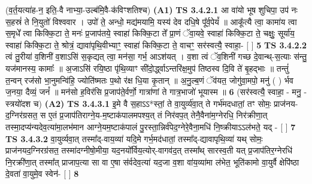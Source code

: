 \documentclass[17pt]{extarticle}
\begin{document}
                  \newline
                      (व॒र्त॒यत्या॑ह-न॒ इति॒-वै नाभ्या॒-उल्ब॑मि॒वै-क॑विꣳशतिश्च)  \textbf{(A1)} \newline \newline
                                        \textbf{ TS 3.4.2.1} \newline
                  आ वा॑यो भूष शुचिपा॒ उप॑ नः स॒हस्रं॑ ते नि॒युतो॑ विश्ववार । उपो॑ ते॒ अन्धो॒ मद्य॑मयामि॒ यस्य॑ देव दधि॒षे पू᳚र्व॒पेयं᳚ ॥ आकू᳚त्यै त्वा॒ कामा॑य त्वा स॒मृधे᳚ त्वा किक्कि॒टा ते॒ मनः॑ प्र॒जाप॑तये॒ स्वाहा॑ किक्कि॒टा ते᳚ प्रा॒णं ॅवा॒यवे॒ स्वाहा॑ किक्कि॒टा ते॒ चक्षुः॒ सूर्या॑य॒ स्वाहा॑ किक्कि॒टा ते॒ श्रोत्रं॒ द्यावा॑पृथि॒वीभ्याꣳ॒॒ स्वाहा॑ किक्कि॒टा ते॒ वाचꣳ॒॒ सर॑स्वत्यै॒ स्वाहा॒- [  ] \textbf{  5} \newline
                  \newline
                                \textbf{ TS 3.4.2.2} \newline
                  त्वं तु॒रीया॑ व॒शिनी॑ व॒शाऽसि॑ स॒कृद्यत् त्वा॒ मन॑सा॒ गर्भ॒ आऽश॑यत् । व॒शा त्वं ॅव॒शिनी॑ गच्छ दे॒वान्थ्-स॒त्याः स॑न्तु॒ यज॑मानस्य॒ कामाः᳚ ॥ अ॒जाऽसि॑ रयि॒ष्ठा पृ॑थि॒व्याꣳ सी॑दो॒र्द्ध्वाऽन्तरि॑क्ष॒मुप॑ तिष्ठस्व दि॒वि ते॑ बृ॒हद्भाः ॥ तन्तुं॑ त॒न्वन् रज॑सो भा॒नुमन्वि॑हि॒ ज्योति॑ष्मतः प॒थो र॑क्ष धि॒या कृ॒तान् ॥ अ॒नु॒ल्ब॒णं ॅव॑यत॒ जोगु॑वा॒मपो॒ मनु॑ ( ) र्भव ज॒नया॒ दैव्यं॒ जनं᳚ ॥ मन॑सो ह॒विर॑सि प्र॒जाप॑ते॒र्वर्णो॒ गात्रा॑णां ते गात्र॒भाजो॑ भूयास्म ॥ \textbf{  6} \newline
                  \newline
                      (सर॑स्वत्यै॒ स्वाहा॒ - मनु॒ - स्त्रयो॑दश च)  \textbf{(A2)} \newline \newline
                                        \textbf{ TS 3.4.3.1} \newline
                  इ॒मे वै स॒हाऽऽ*स्तां॒ ते वा॒युर्व्य॑वा॒त् ते गर्भ॑मदधातां॒ तꣳ सोमः॒ प्राज॑नय-द॒ग्निर॑ग्रसत॒ स ए॒तं प्र॒जाप॑तिराग्ने॒य-म॒ष्टाक॑पालमपश्य॒त् तं निर॑वप॒त् तेनै॒वैना॑म॒ग्नेरधि॒ निर॑क्रीणा॒त् तस्मा॒दप्य॑न्यदेव॒त्या॑मा॒लभ॑मान आग्ने॒यम॒ष्टाक॑पालं पु॒रस्ता॒न्निर्व॑पेद॒ग्नेरे॒वैना॒मधि॑ नि॒ष्क्रीयाऽऽल॑भते॒ यद् - [  ] \textbf{  7} \newline
                  \newline
                                \textbf{ TS 3.4.3.2} \newline
                  वा॒युर्व्यवा॒त् तस्मा᳚द्-वाय॒व्या॑ यदि॒मे गर्भ॒मद॑धातां॒ तस्मा᳚द्-द्यावापृथि॒व्या॑ यथ् सोमः॒ प्राज॑नयद॒ग्निरग्र॑सत॒ तस्मा॑दग्नीषो॒मीया॒ यद॒नयो᳚र्विय॒त्योर्-वागव॑द॒त् तस्मा᳚थ् सारस्व॒ती यत् प्र॒जाप॑तिर॒ग्नेरधि॑ नि॒रक्री॑णा॒त् तस्मा᳚त् प्राजाप॒त्या सा वा ए॒षा स॑र्वदेव॒त्या॑ यद॒जा व॒शा वा॑य॒व्या॑मा ल॑भेत॒ भूति॑कामो वा॒युर्वै क्षेपि॑ष्ठा दे॒वता॑ वा॒युमे॒व स्वेन॑- [  ] \textbf{  8} \newline
\end{document}
